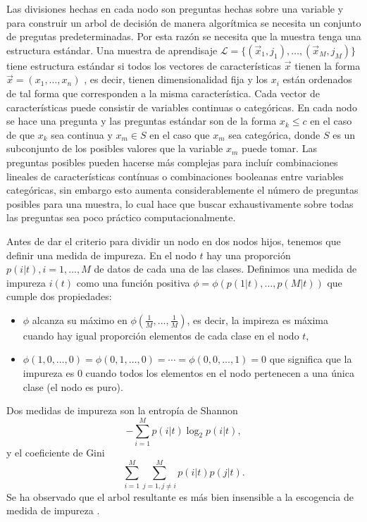 \documentclass[letterpaper,12pt]{book}
\begin{document}
Las divisiones hechas en cada nodo son preguntas hechas sobre una variable y para construir un arbol de decisión  de manera algorítmica se necesita un conjunto de pregutas predeterminadas. Por esta razón se necesita que la muestra tenga una estructura estándar. Una muestra de aprendisaje $\mathcal{L} = \{(\vec{x}_1,j_1),\dots,(\vec{x}_M,j_M)\}$ tiene estructura estándar si todos los vectores de características $\vec{x}$ tienen la forma $\vec{x} = (x_{1},\dots,x_{n})$ , es decir, tienen dimensionalidad fija y los $x_i$ están ordenados de tal forma que corresponden a la misma característica. Cada vector de características puede consistir de variables continuas o categóricas. En cada nodo se hace una pregunta y las preguntas estándar son de la forma $x_k\leq c$ en el caso de que $x_k$ sea continua y $x_m\in S$ en el caso que $x_m$ sea categórica, donde $S$ es un subconjunto de los posibles valores que la variable $x_m$ puede tomar. Las preguntas posibles pueden hacerse más complejas para incluír combinaciones lineales de características contínuas o combinaciones booleanas entre variables categóricas, sin embargo esto aumenta considerablemente el número de preguntas posibles para una muestra, lo cual hace que buscar exhaustivamente sobre todas las preguntas sea poco práctico computacionalmente.

Antes de dar el criterio para dividir un nodo en dos nodos hijos, tenemos que definir una medida de impureza. En el nodo $t$ hay una proporción $p(i|t), i=1,\dots,M$ de datos de cada una de las clases. Definimos una medida de impureza $i(t)$ como una función positiva $\phi = \phi(p(1|t),\dots,p(M|t))$ que cumple dos propiedades:
\begin{itemize}
\item $\phi$ alcanza su máximo en  $\phi(\frac{1}{M},\dots,\frac{1}{M}) $, es decir, la impireza es máxima cuando hay igual proporción elementos de cada clase en el nodo $t$, 
\item $\phi(1,0,\dots,0) = \phi(0,1,\dots,0) = \cdots =\phi(0,0,\dots,1) = 0$ que significa que la impureza es $0$ cuando todos los elementos en el nodo pertenecen a una única clase (el nodo es puro).
\end{itemize}
Dos medidas de impureza son la entropía de Shannon
\begin{equation}
-\sum_{i=1}^{M}p(i|t)\log_2p(i|t),
\end{equation}
y el coeficiente de Gini
\begin{equation}
\sum_{i=1}^{M}\sum_{j=1, j\neq i}^{M}p(i|t)p(j|t).
\end{equation}
Se ha observado que el arbol resultante es más bien insensible a la escogencia de medida de impureza \cite{breiman_classification_1984}.
\end{document}
